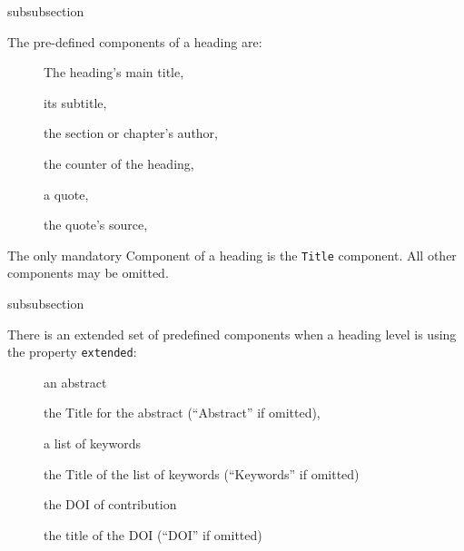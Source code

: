 \begin{heading}[label=sec:hdg:comp:predef]{subsubsection}
\end{heading}

The pre-defined components of a heading are:
\begin{description}
\item[\string\tpTitle] The heading's main title,
\item[\string\tpSubtitle] its subtitle,
\item[\string\tpAuthor] the section or chapter's author,
\item[\string\tpNumber] the counter of the heading,
\item[\string\tpQuote] a quote,
\item[\string\tpQuoteSource] the quote's source,
\end{description}
The only mandatory Component of a heading is the \lstinline{Title}
component. All other components may be omitted.

\begin{heading}{subsubsection}
\end{heading}

There is an extended set of predefined components when a heading level is using the property \lstinline{extended}:
\begin{description}
\item[\string\tpAbstract] an abstract
\item[\string\tpAbstractLabel] the Title for the abstract (``Abstract'' if omitted),
\item[\string\tpKeywords] a list of keywords 
\item[\string\tpKeywordsLabel] the Title of the list of keywords (``Keywords'' if omitted)
\item[\string\tpDOI] the DOI of contribution
\item[\string\tpDOILabel] the title of the DOI (``DOI'' if omitted)
\end{description}


